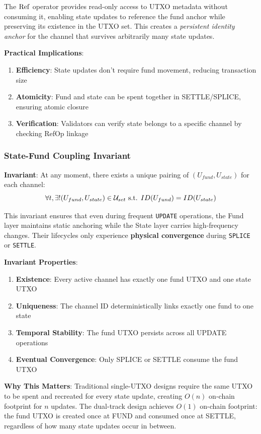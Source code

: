 The $\operatorname{Ref}$ operator provides read-only access to UTXO metadata without consuming it, enabling state updates to reference the fund anchor while preserving its existence in the UTXO set. This creates a \textit{persistent identity anchor} for the channel that survives arbitrarily many state updates.

\textbf{Practical Implications}:
\begin{enumerate}
    \item \textbf{Efficiency}: State updates don't require fund movement, reducing transaction size
    \item \textbf{Atomicity}: Fund and state can be spent together in SETTLE/SPLICE, ensuring atomic closure
    \item \textbf{Verification}: Validators can verify state belongs to a specific channel by checking RefOp linkage
\end{enumerate}

\subsubsection{State-Fund Coupling Invariant}

\textbf{Invariant}: At any moment, there exists a unique pairing of $(U_{fund}, U_{state})$ for each channel:
$$\forall t, \exists! (U_{fund}, U_{state}) \in \mathcal{U}_{set} \text{ s.t. } ID(U_{fund}) = ID(U_{state})$$

This invariant ensures that even during frequent \texttt{UPDATE} operations, the Fund layer maintains static anchoring while the State layer carries high-frequency changes. Their lifecycles only experience \textbf{physical convergence} during \texttt{SPLICE} or \texttt{SETTLE}.

\textbf{Invariant Properties}:
\begin{enumerate}
    \item \textbf{Existence}: Every active channel has exactly one fund UTXO and one state UTXO
    \item \textbf{Uniqueness}: The channel ID deterministically links exactly one fund to one state
    \item \textbf{Temporal Stability}: The fund UTXO persists across all UPDATE operations
    \item \textbf{Eventual Convergence}: Only SPLICE or SETTLE consume the fund UTXO
\end{enumerate}

\textbf{Why This Matters}:
Traditional single-UTXO designs require the same UTXO to be spent and recreated for every state update, creating $O(n)$ on-chain footprint for $n$ updates. The dual-track design achieves $O(1)$ on-chain footprint: the fund UTXO is created once at FUND and consumed once at SETTLE, regardless of how many state updates occur in between.

